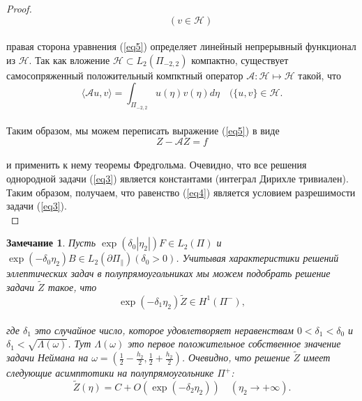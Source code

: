\documentclass[12pt,titlepage]{report}
\newtheorem{remark}{Замечание}
\begin{document}
\begin{proof}
\begin{equation}
\begin{aligned}
		 \end{aligned} \quad(v \in \mathcal{H})
	 \end{equation}\\
	 правая сторона уравнения (\ref{eq5}) определяет линейный непрерывный функционал из $\mathcal{H}$. Так как вложение $\mathcal{H} \subset L_{2}\left(\Pi_{-2,2}\right)$ компактно, существует самосопряженный положительный компктный оператор $\mathcal{A}: \mathcal{H} \mapsto \mathcal{H}$ такой, что\\
	 $$\langle\mathcal{A} u, v\rangle=\int_{\Pi_{-2,2}} u(\eta) v(\eta) d \eta \quad(\{u, v\} \in \mathcal{H}.$$\\
	 
	 Таким образом, мы можем переписать выражение (\ref{eq5}) в виде\\
	 $$Z-\mathcal{A} Z=f$$\\
	 и применить к нему теоремы Фредгольма. Очевидно, что все решения однородной задачи (\ref{eq3}) является константами (интеграл Дирихле тривиален). Таким образом, получаем, что равенство (\ref{eq4}) является условием разрешимости задачи (\ref{eq3}).\\
	\end{proof}
	 
	 \begin{remark}
	 	\label{rem1}
	 	Пусть $\exp \left(\delta_{0}\left|\eta_{2}\right|\right) F \in L_{2}(\Pi)$ и $\exp \left(-\delta_{0} \eta_{2}\right) B \in L_{2}\left(\partial \Pi_{\|}\right)\left(\delta_{0}>0\right)$. Учитывая характеристики решений эллептических задач в полупрямоугольниках мы можем подобрать решение задачи $\widetilde{Z}$ такое, что\\
	 	$$\exp \left(-\delta_{1} \eta_{2}\right) \widetilde{Z} \in H^{1}\left(\Pi^{-}\right),$$\\
	 	где $\delta_{1}$ это случайное число, которое удовлетворяет неравенствам $0<\delta_{1}<\delta_{0}$ и $\delta_{1}<\sqrt{\Lambda(\omega)}$. Тут $\Lambda(\omega)$ это первое положительное собственное значение задачи Неймана на $\omega = \left(\frac{1}{2}-\frac{h_{2}}{2}, \frac{1}{2}+\frac{h_{2}}{2}\right)$. Очевидно, что решение $\widetilde{Z}$ имеет следующие асимптотики на полупрямоугольнике $\Pi^{+}$:\\
	 	\begin{equation}
	 	\label{eq10}
		 	\tilde{Z}(\eta)=C+O\left(\exp \left(-\delta_{2} \eta_{2}\right)\right) \quad\left(\eta_{2} \rightarrow+\infty\right).
	 	\end{equation}
	\end{remark}
	 
\end{document}
